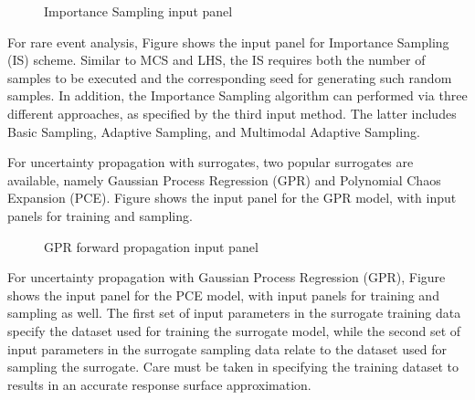 \begin{figure}[!htbp]
  \caption{Importance Sampling input panel}
  \label{fig:is}
\end{figure}

For rare event analysis, Figure  shows the input panel for Importance Sampling (IS) scheme. Similar to MCS and LHS, the IS requires both the number of samples to be executed and the corresponding seed for generating such random samples. In addition, the Importance Sampling algorithm can performed via three different approaches, as specified by the third input method. The latter includes Basic Sampling, Adaptive Sampling, and Multimodal Adaptive Sampling. 


For uncertainty propagation with surrogates, two popular surrogates are available, namely Gaussian Process Regression (GPR) and Polynomial Chaos Expansion (PCE). Figure  shows the input panel for the GPR model, with input panels for training and sampling. 

\begin{figure}[!htbp]
  \caption{GPR forward propagation input panel}
  \label{fig:gpr}
\end{figure}

For uncertainty propagation with Gaussian Process Regression (GPR), Figure  shows the input panel for the PCE model, with input panels for training and sampling as well. The first set of input parameters in the surrogate training data specify the dataset used for training the surrogate model, while the second set of input parameters in the surrogate sampling data relate to the dataset used for sampling the surrogate. Care must be taken in specifying the training dataset to results in an accurate response surface approximation. 

